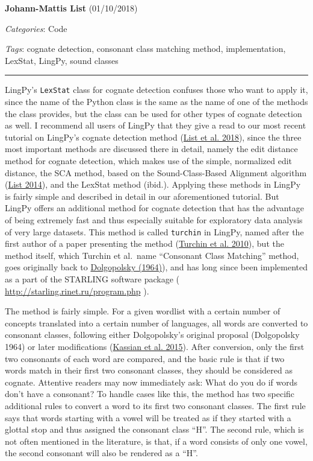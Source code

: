 \documentclass[
  english,
  a4paper,
  oneside,tablecaptionabove
]{scrbook}
\newcommand{\passthrough}[1]{#1}
\begin{document}
\textbf{Johann-Mattis List} (01/10/2018)

\emph{Categories}: Code

\emph{Tags}: cognate detection, consonant class matching method,
implementation, LexStat, LingPy, sound classes

\begin{center}\rule{0.5\linewidth}{\linethickness}\end{center}

LingPy's \passthrough{\lstinline!LexStat!} class for cognate detection
confuses those who want to apply it, since the name of the Python class
is the same as the name of one of the methods the class provides, but
the class can be used for other types of cognate detection as well. I
recommend all users of LingPy that they give a read to our most recent
tutorial on LingPy's cognate detection method (\href{http://bibliography.lingpy.org?key=List2018d}{List et al. 2018}),
since the three most important methods are discussed there in detail,
namely the edit distance method for cognate detection, which makes use
of the simple, normalized edit distance, the SCA method, based on the
Sound-Class-Based Alignment algorithm (\href{http://bibliography.lingpy.org?key=List2014d}{List 2014}), and
the LexStat method (ibid.). Applying these methods in LingPy is fairly
simple and described in detail in our aforementioned tutorial. But
LingPy offers an additional method for cognate detection that has the
advantage of being extremely fast and thus especially suitable for
exploratory data analysis of very large datasets. This method is called
\passthrough{\lstinline!turchin!} in LingPy, named after the first
author of a paper presenting the method (\href{http://bibliography.lingpy.org?key=Turchin2010}{Turchin et al.
2010}), but the method itself, which Turchin et al.~name
\enquote{Consonant Class Matching} method, goes originally back to
\href{http://bibliography.lingpy.org?key=Dolgopolsky1964}{Dolgopolsky
(1964)}), and has long since been implemented as a part of the STARLING
software package (
\href{http://starling.rinet.ru/program.php?lan=en}{http://starling.rinet.ru/program.php}
). \protect\hypertarget{more-477}{}{}

The method is fairly simple. For a given wordlist with a certain number
of concepts translated into a certain number of languages, all words are
converted to consonant classes, following either Dolgopolsky's original
proposal (Dolgopolsky 1964) or later modifications (\href{http://bibliography.lingpy.org?key=Kassian2015b}{Kassian et al.
2015}). After conversion, only the first two consonants of each word
are compared, and the basic rule is that if two words match in their
first two consonant classes, they should be considered as cognate.
Attentive readers may now immediately ask: What do you do if words don't
have a consonant? To handle cases like this, the method has two specific
additional rules to convert a word to its first two consonant classes.
The first rule says that words starting with a vowel will be treated as
if they started with a glottal stop and thus assigned the consonant
class \enquote{H}. The second rule, which is not often mentioned in the
literature, is that, if a word consists of only one vowel, the second
consonant will also be rendered as a \enquote{H}.
\end{document}
